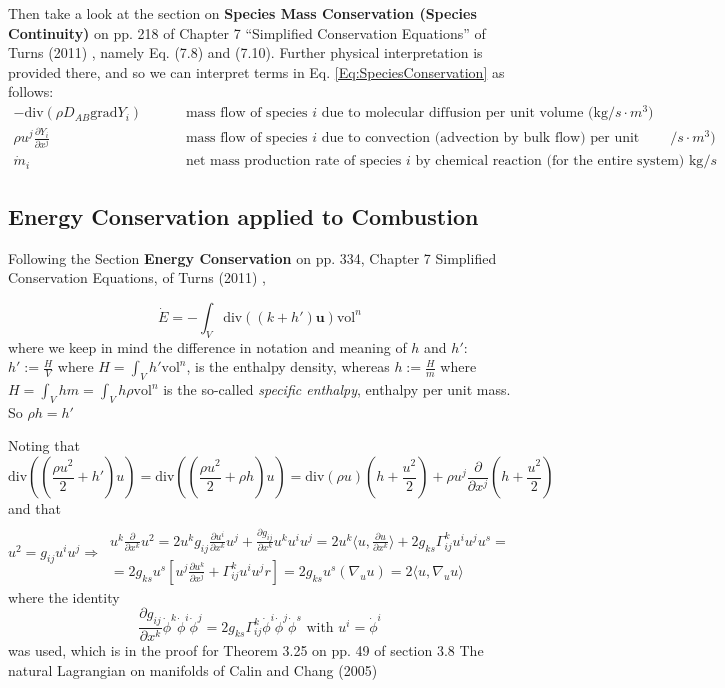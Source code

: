 \documentclass[10pt]{amsart}
\begin{document}
\begin{multicols*}{2}
Then take a look at the section on \textbf{Species Mass Conservation (Species Continuity)} on pp. 218 of Chapter 7 ``Simplified Conservation Equations'' of Turns (2011) \cite{STurns2011}, namely Eq. (7.8) and (7.10).  Further physical interpretation is provided there, and so we can interpret terms in Eq. \ref{Eq:SpeciesConservation} as follows:
\[
\begin{aligned}
  -\text{div}(\rho D_{AB} \text{grad}Y_i) & \qquad  \text{ mass flow of species $i$ due to molecular diffusion per unit volume (kg$/s\cdot m^3$) } \\ 
    \rho u^j \frac{ \partial Y_i}{ \partial x^j} & \qquad \text{ mass flow of species $i$ due to convection (advection by bulk flow) per unit volume (kg$/s\cdot m^3$) }  \\
    \dot{m}_i & \qquad \text{ net mass production rate of species $i$ by chemical reaction (for the entire system) $\text{kg}/s$ }
\end{aligned}
\]



\subsection{Energy Conservation applied to Combustion}

Following the Section \textbf{Energy Conservation} on pp. 334, Chapter 7 Simplified Conservation Equations, of Turns (2011) \cite{STurns2011}, 

\[
\dot{E} = -\int_V \text{div}((k+h')\mathbf{u}) \text{vol}^n 
\]
where we keep in mind the difference in notation and meaning of $h$ and $h'$: $h' := \frac{H}{V}$ where $H = \int_V h'\text{vol}^n$, is the enthalpy density, whereas $h:= \frac{H}{m}$ where $H = \int_V hm = \int_V h\rho \text{vol}^n$ is the so-called \emph{specific enthalpy}, enthalpy per unit mass.  So $\rho h = h'$



Noting that 
\[
\text{div}((\frac{\rho u^2}{2} + h' )u) = \text{div}((\frac{\rho u^2}{2} + \rho h)u) = \text{div}(\rho u)(h + \frac{u^2}{2} ) + \rho u^j \frac{ \partial }{ \partial x^j}(h+\frac{u^2}{2} )
\]
and that 
\[
u^2 = g_{ij} u^i u^j \Longrightarrow  \, 
\begin{gathered}
  \quad \\
  u^k \frac{ \partial }{ \partial x^k } u^2 = 2 u^k g_{ij} \frac{ \partial u^i}{ \partial x^k} u^j + \frac{ \partial g_{ij} }{ \partial x^k } u^k u^i u^j = 2u^k \langle u, \frac{ \partial u}{ \partial x^k} \rangle + 2g_{ks} \Gamma^k_{ij} u^i u^j u^s = \\ 
  = 2g_{ks}u^s \left[ u^j \frac{ \partial u^k}{\partial x^j} + \Gamma^k_{ij} u^i u^jr \right]  = 2 g_{ks} u^s (\nabla_u u) = 2\langle u , \nabla_u u \rangle
\end{gathered}
\]
where the identity
\[
\frac{ \partial g_{ij} }{ \partial x^k} \dot{\phi}^k \dot{\phi}^i \dot{\phi}^j = 2 g_{ks} \Gamma^k_{ij} \dot{\phi}^i \dot{\phi}^j \dot{\phi}^s  \text{ with } u^i = \dot{\phi}^i
\]
was used, which is in the proof for Theorem 3.25 on pp. 49 of section 3.8 The natural Lagrangian on manifolds of Calin and Chang (2005) \cite{OCalinDChang2005}


\end{multicols*}
\end{document}
